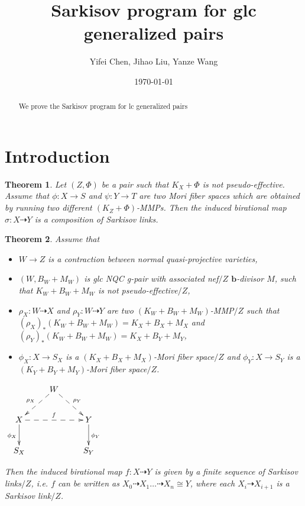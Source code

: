 \documentclass[11pt]{amsart}
\numberwithin{equation}{section}
\newcommand{\bb}{\bm{b}}
\newtheorem{thm}{Theorem}[section]
\theoremstyle{definition}
\theoremstyle{definition}
\theoremstyle{definition}
\begin{document}
\title{Sarkisov program for glc generalized pairs}
\author{Yifei Chen, Jihao Liu, Yanze Wang}







\date{\today}

\begin{abstract}
We prove the Sarkisov program for lc generalized pairs
\end{abstract}


\maketitle
\tableofcontents

\section{Introduction}

\begin{thm}\label{sp} 
Let $(Z,\Phi)$ be a  pair such that $K_X+\Phi$ is not pseudo-effective. Assume that $\phi: X\rightarrow S$ and $\psi: Y\rightarrow T$ are two Mori fiber spaces which are obtained by running two different $(K_Z+\Phi)$-MMPs. Then the induced birational map $\sigma: X\dashrightarrow Y$ is a composition of Sarkisov links.
\end{thm}

\begin{thm}\label{main theorem}
Assume that 
\begin{itemize}
    \item $W\rightarrow Z$ is a contraction between normal quasi-projective varieties,
    \item $(W,B_W+M_W)$ is glc NQC g-pair with associated nef$/Z$ $\bb$-divisor $M$, such that $K_W+B_W+M_W$ is not pseudo-effective$/Z$,
    \item $\rho_X: W\dashrightarrow X$ and $\rho_Y: W\dashrightarrow Y$ are two $(K_W+B_W+M_W)$-MMP$/Z$ such that $(\rho_X)_*(K_W+B_W+M_W)=K_X+B_X+M_X$ and $(\rho_Y)_*(K_W+B_W+M_W)=K_X+B_Y+M_Y$,
    \item $\phi_X: X\rightarrow S_X$ is a $(K_X+B_X+M_X)$-Mori fiber space$/Z$ and $\phi_Y: X\rightarrow S_Y$ is a $(K_Y+B_Y+M_Y)$-Mori fiber space$/Z$.
\end{itemize}
\begin{center}$\xymatrix{
 & W\ar@{-->}[dl]_{\rho_X}\ar@{-->}[dr]^{\rho_Y}& \\
      X \ar@{->}[d]_{\phi_X}\ar@{-->}[rr]^{f}   &  & Y\ar@{->}[d]^{\phi_Y} \\
    S_X & &S_Y }$
\end{center}
Then
     the induced birational map $f: X\dashrightarrow Y$ is given by a finite sequence of Sarkisov links$/Z$, i.e. $f$ can be written as $X_0\dashrightarrow X_1\dots\dashrightarrow X_n\cong Y$, where each $X_{i}\dashrightarrow X_{i+1}$ is a Sarkisov link$/Z$. 
\end{thm}
\end{document}
